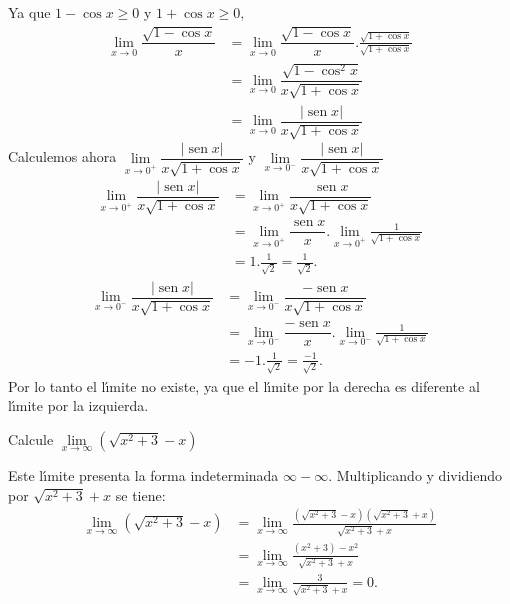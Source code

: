 \begin{sol}
Ya que $1-\cos x\geq0$ y $1+\cos x\geq0,$%
\begin{align*}
\lim\limits_{x\rightarrow0}\dfrac{\sqrt{1-\cos x}}{x}  &  =\lim
\limits_{x\rightarrow0}\dfrac{\sqrt{1-\cos x}}{x}.\frac{\sqrt{1+\cos x}}%
{\sqrt{1+\cos x}}\\
&  =\lim\limits_{x\rightarrow0}\dfrac{\sqrt{1-\cos^{2}x}}{x\sqrt{1+\cos x}}\\
&  =\lim\limits_{x\rightarrow0}\dfrac{\left|  \operatorname{sen}x\right|
}{x\sqrt{1+\cos x}}%
\end{align*}
Calculemos ahora $\lim\limits_{x\rightarrow0^{+}}\dfrac{\left|
\operatorname{sen}x\right|  }{x\sqrt{1+\cos x}}$ y $\lim\limits_{x\rightarrow
0^{-}}\dfrac{\left|  \operatorname{sen}x\right|  }{x\sqrt{1+\cos x}}$
\begin{align*}
\lim\limits_{x\rightarrow0^{+}}\dfrac{\left|  \operatorname{sen}x\right|
}{x\sqrt{1+\cos x}}  &  =\lim\limits_{x\rightarrow0^{+}}\dfrac
{\operatorname{sen}x}{x\sqrt{1+\cos x}}\\
&  =\lim\limits_{x\rightarrow0^{+}}\dfrac{\operatorname{sen}x}{x}%
.\lim\limits_{x\rightarrow0^{+}}\frac{1}{\sqrt{1+\cos x}}\\
&  =1.\frac{1}{\sqrt{2}}=\frac{1}{\sqrt{2}}.
\end{align*}%
\begin{align*}
\lim\limits_{x\rightarrow0^{-}}\dfrac{\left|  \operatorname{sen}x\right|
}{x\sqrt{1+\cos x}}  &  =\lim\limits_{x\rightarrow0^{-}}\dfrac
{-\operatorname{sen}x}{x\sqrt{1+\cos x}}\\
&  =\lim\limits_{x\rightarrow0^{-}}\dfrac{-\operatorname{sen}x}{x}%
.\lim\limits_{x\rightarrow0^{-}}\frac{1}{\sqrt{1+\cos x}}\\
&  =-1.\frac{1}{\sqrt{2}}=\frac{-1}{\sqrt{2}}.
\end{align*}
Por lo tanto el l\'{\i}mite no existe, ya que el l\'{\i}mite por la derecha es
diferente al l\'{\i}mite por la izquierda.
\end{sol}

\begin{example}
Calcule $\lim\limits_{x\rightarrow\infty}(\sqrt{x^{2}+3}-x)$
\end{example}

\begin{sol}
Este l\'{\i}mite presenta la forma indeterminada $\infty-\infty$.
Multiplicando y dividiendo por $\sqrt{x^{2}+3}+x$ se tiene:%
\begin{align*}
\lim\limits_{x\rightarrow\infty}(\sqrt{x^{2}+3}-x)  &  =\lim
\limits_{x\rightarrow\infty}\frac{(\sqrt{x^{2}+3}-x)(\sqrt{x^{2}+3}+x)}%
{\sqrt{x^{2}+3}+x}\\
&  =\lim\limits_{x\rightarrow\infty}\frac{(x^{2}+3)-x^{2}}{\sqrt{x^{2}+3}+x}\\
&  =\lim\limits_{x\rightarrow\infty}\frac{3}{\sqrt{x^{2}+3}+x}=0.
\end{align*}

\end{sol}


